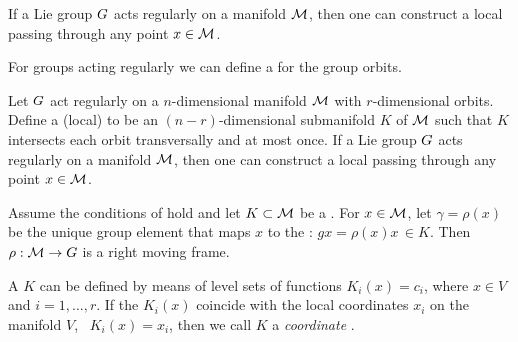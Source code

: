 If a Lie group $G$ acts
 regularly on a manifold $\mathcal{M}$, then one can construct a
 local {\csection} passing through any point $x\in \mathcal{M}$.

For groups acting regularly we can define a {\csection} for
the group orbits.


\begin{proposition}%
 \label{pro:crossExists}
 Let $G$ act regularly on a $n$-dimensional manifold
 $\mathcal{M}$ with $r$-dimensional orbits. Define a (local)
 \emph{{\csection}} to be an $(n-r)$-dimensional submanifold $K$
 of $\mathcal{M}$ such that $K$ intersects each orbit
 transversally and at most once. If a Lie group $G$ acts
 regularly on a manifold $\mathcal{M}$, then one can construct a
 local {\csection} passing through any point $x\in \mathcal{M}$.
\end{proposition}



\begin{theorem}
 Assume the conditions of  hold and
 let $K\subset\mathcal{M}$ be a {\csection}. For $x\in \mathcal{M}$, let
 $\gamma=\rho(x)$ be the unique group element that maps $x$
 to the {\csection}: $g x = \rho(x) x\, \in K$. Then
 $\rho:\mathcal{M}\rightarrow G$ is a right moving frame.
\end{theorem}

A {\csection} $K$ can be defined by means of level sets of
functions $K_i(x)=c_i$, where $x\in V$ and $i=1,\ldots,r$. If
the $K_i(x)$ coincide with the local coordinates $x_i$ on the
manifold $V$, \ie~$K_i(x)=x_i$, then we call $K$ a
\emph{coordinate \csection}.

